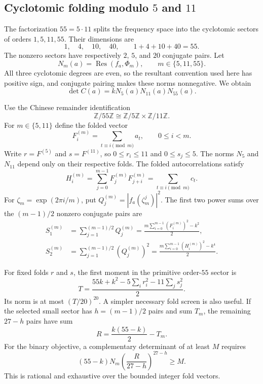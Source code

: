 \documentclass[11pt,a4paper]{article}
\theoremstyle{remark}
\DeclareMathOperator{\Res}{Res}
\newcommand{\Z}{\mathbb Z}
\begin{document}
\subsection{Cyclotomic folding modulo $5$ and $11$}

The factorization $55=5\cdot11$ splits the frequency space into the
cyclotomic sectors of orders $1,5,11,55$.  Their dimensions are
\[
  1,\quad4,\quad10,\quad40,
  \qquad 1+4+10+40=55.
\]
The nonzero sectors have respectively $2$, $5$, and $20$ conjugate pairs.
Let
\[
  N_m(a)=\Res(f_a,\Phi_m),
  \qquad m\in\{5,11,55\}.
\]
All three cyclotomic degrees are even, so the resultant convention used here
has positive sign, and conjugate pairing makes these norms nonnegative.  We
obtain
\begin{equation}
\label{eq:resultant-factorization}
  \det C(a)=kN_5(a)N_{11}(a)N_{55}(a).
\end{equation}

Use the Chinese remainder identification
\[
  \Z/55\Z\cong\Z/5\Z\times\Z/11\Z.
\]
For $m\in\{5,11\}$ define the folded vector
\[
 F_i^{(m)}=\sum_{t\equiv i\pmod m}a_t,\qquad 0\leq i<m.
\]
Write $r=F^{(5)}$ and $s=F^{(11)}$, so
$0\leq r_i\leq11$ and $0\leq s_j\leq5$.
The norms $N_5$ and $N_{11}$ depend only on their respective folds.
The folded autocorrelations satisfy
\[
 H_i^{(m)}=\sum_{j=0}^{m-1}F_j^{(m)}F_{j+i}^{(m)}
          =\sum_{t\equiv i\pmod m}c_t.
\]
For $\zeta_m=\exp(2\pi i/m)$, put
$Q_j^{(m)}=|f_a(\zeta_m^j)|^2$.  The first two power sums
over the $(m-1)/2$ nonzero conjugate pairs are
\begin{align}
 S_1^{(m)}&=\sum_{j=1}^{(m-1)/2}Q_j^{(m)}
   =\frac{m\sum_{i=0}^{m-1}(F_i^{(m)})^2-k^2}{2},\\
 S_2^{(m)}&=\sum_{j=1}^{(m-1)/2}(Q_j^{(m)})^2
   =\frac{m\sum_{i=0}^{m-1}(H_i^{(m)})^2-k^4}{2}.
\end{align}

For fixed folds $r$ and $s$, the first moment in the primitive order-$55$
sector is
\begin{equation}
\label{eq:primitive-sector-sum}
  T=\frac{55k+k^2-5\sum_i r_i^2-11\sum_j s_j^2}{2}.
\end{equation}
Its norm is at most $(T/20)^{20}$.  A simpler necessary fold screen is also
useful.  If the selected small sector has $h=(m-1)/2$ pairs and sum $T_m$,
the remaining $27-h$ pairs have sum
\[
  R=\frac{k(55-k)}2-T_m.
\]
For the binary objective, a complementary determinant of at least $M$
requires
\begin{equation}
\label{eq:fold-screen}
  (55-k)N_m\left(\frac{R}{27-h}\right)^{27-h}\geq M.
\end{equation}
This is rational and exhaustive over the bounded integer fold vectors.
\end{document}
